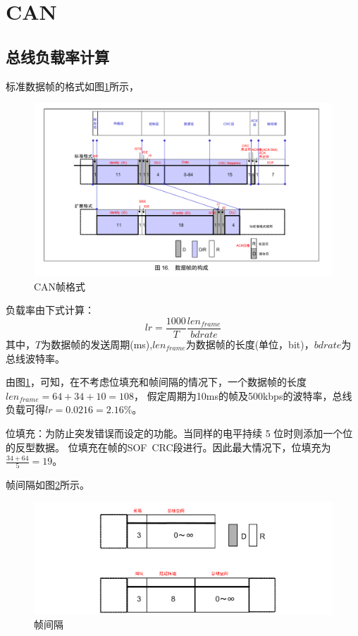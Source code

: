 \section{CAN}
\subsection{总线负载率计算}
标准数据帧的格式如图\ref{fig:can_frame}所示，
\begin{figure}[ht]
    \centering
    \includegraphics[scale=0.7]{pic/can_frame.png}
    \caption{CAN帧格式}
    \label{fig:can_frame}
\end{figure}

负载率由下式计算\cite{url_can_load_rate}：
$$lr = \frac{1000}{T} \frac{len_{frame}}{bdrate} $$
其中，$T$为数据帧的发送周期(ms),$len_{frame}$为数据帧的长度(单位，bit)，$bdrate$为总线波特率。

由图\ref{fig:can_frame}，可知，在不考虑位填充和帧间隔的情况下，一个数据帧的长度$len_{frame}=64+34+10=108$，
假定周期为10ms的帧及500kbps的波特率，总线负载可得$lr=0.0216=2.16\%$。

位填充：为防止突发错误而设定的功能。当同样的电平持续 5 位时则添加一个位的反型数据。 
位填充在帧的SOF~CRC段进行。因此最大情况下，位填充为$\frac{34+64}{5}=19$。

帧间隔如图\ref{fig:frame_jiange}所示。
\begin{figure}[ht]
    \centering
    \includegraphics[]{pic/frame_jiange.png}
    \caption{帧间隔}
    \label{fig:frame_jiange}
\end{figure}


